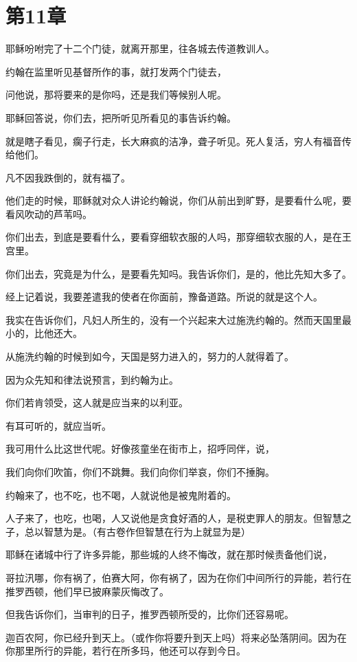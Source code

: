 \documentclass[12pt,oneside]{book}
\begin{document}
\chapter{第11章}
耶稣吩咐完了十二个门徒，就离开那里，往各城去传道教训人。

约翰在监里听见基督所作的事，就打发两个门徒去，

问他说，那将要来的是你吗，还是我们等候别人呢。

耶稣回答说，你们去，把所听见所看见的事告诉约翰。

就是瞎子看见，瘸子行走，长大麻疯的洁净，聋子听见。死人复活，穷人有福音传给他们。

凡不因我跌倒的，就有福了。

他们走的时候，耶稣就对众人讲论约翰说，你们从前出到旷野，是要看什么呢，要看风吹动的芦苇吗。

你们出去，到底是要看什么，要看穿细软衣服的人吗，那穿细软衣服的人，是在王宫里。

你们出去，究竟是为什么，是要看先知吗。我告诉你们，是的，他比先知大多了。

经上记着说，我要差遣我的使者在你面前，豫备道路。所说的就是这个人。

我实在告诉你们，凡妇人所生的，没有一个兴起来大过施洗约翰的。然而天国里最小的，比他还大。

从施洗约翰的时候到如今，天国是努力进入的，努力的人就得着了。

因为众先知和律法说预言，到约翰为止。

你们若肯领受，这人就是应当来的以利亚。

有耳可听的，就应当听。

我可用什么比这世代呢。好像孩童坐在街市上，招呼同伴，说，

我们向你们吹笛，你们不跳舞。我们向你们举哀，你们不捶胸。

约翰来了，也不吃，也不喝，人就说他是被鬼附着的。

人子来了，也吃，也喝，人又说他是贪食好酒的人，是税吏罪人的朋友。但智慧之子，总以智慧为是。（有古卷作但智慧在行为上就显为是）

耶稣在诸城中行了许多异能，那些城的人终不悔改，就在那时候责备他们说，

哥拉汛哪，你有祸了，伯赛大阿，你有祸了，因为在你们中间所行的异能，若行在推罗西顿，他们早已披麻蒙灰悔改了。

但我告诉你们，当审判的日子，推罗西顿所受的，比你们还容易呢。

迦百农阿，你已经升到天上。（或作你将要升到天上吗）将来必坠落阴间。因为在你那里所行的异能，若行在所多玛，他还可以存到今日。
\end{document}
